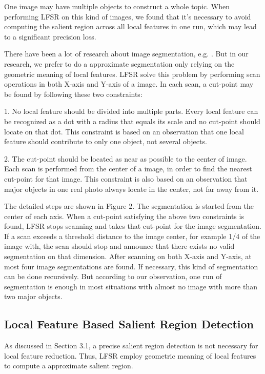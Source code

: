 One image may have multiple objects to construct a whole topic. When performing LFSR on this kind of images, we found that it's necessary to avoid computing the salient region across all local features in one run, which may lead to a significant precision loss.

There have been a lot of research about image segmentation, e.g. . But in our research, we prefer to do a approximate segmentation only relying on the geometric meaning of local features. LFSR solve this problem by performing scan operations in both X-axis and Y-axis of a image. In each scan, a cut-point may be found by following these two constraints:

1. No local feature should be divided into multiple parts. Every local feature can be recognized as a dot with a radius that equals its scale and no cut-point should locate on that dot. This constraint is based on an observation that one local feature should contribute to only one object, not several objects.

2. The cut-point should be located as near as possible to the center of image. Each scan is performed from the center of a image, in order to find the nearest cut-point for that image. This constraint is also based on an observation that major objects in one real photo always locate in the center, not far away from it.

The detailed steps are shown in Figure 2. The segmentation is started from the center of each axis. When a cut-point satisfying the above two constraints is found, LFSR stops scanning and takes that cut-point for the image segmentation. If a scan exceeds a threshold distance to the image center, for example 1/4 of the image with, the scan should stop and announce that there exists no valid segmentation on that dimension. After scanning on both X-axis and Y-axis, at most four image segmentations are found. If necessary, this kind of segmentation can be done recursively. But according to our observation, one run of segmentation is enough in most situations with almost no image with more than two major objects.

\subsection{Local Feature Based Salient Region Detection}

As discussed in Section 3.1, a precise salient region detection is not necessary for local feature reduction. Thus, LFSR employ geometric meaning of local features to compute a approximate salient region.

